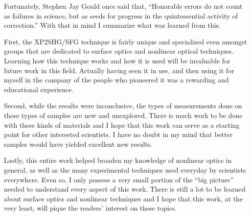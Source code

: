 Fortunately, Stephen Jay Gould once said that, ``Honorable errors do not count
as failures in science, but as seeds for progress in the quintessential activity
of correction.'' With that in mind I summarize what was learned from this.

First, the XP2SHG/SFG technique is fairly unique and specialized even amongst
groups that are dedicated to surface optics and nonlinear optical techniques.
Learning how this technique works and how it is used will be invaluable for
future work in this field. Actually having seen it in use, and then using it for
myself in the company of the people who pioneered it was a rewarding and
educational experience.

Second, while the results were inconclusive, the types of measurements done on
these types of samples are new and unexplored. There is much work to be done
with these kinds of materials and I hope that this work can serve as a starting
point for other interested scientists. I have no doubt in my mind that better
samples would have yielded excellent new results.

Lastly, this entire work helped broaden my knowledge of nonlinear optics in
general, as well as the many experimental techniques used everyday by scientists
everywhere. Even so, I only possess a very small portion of the ``big picture''
needed to understand every aspect of this work. There is still a lot to be
learned about surface optics and nonlinear techniques and I hope that this work,
at the very least, will pique the readers' interest on these topics.

\stopcontents[chapters]

